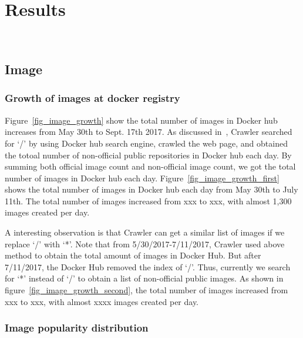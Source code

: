 
\section{Results}

\\

\subsection{Image}

\subsubsection{Growth  of images at docker registry}

Figure~\ref{fig_image_growth} show the total number of images in Docker hub increases from May 30th to Sept. 17th 2017. As discussed in~\cite{XXX}, Crawler searched for `/' by using Docker hub search engine, crawled the web page, and obtained the totoal number of non-official public repositories in Docker hub each day. By summing both official image count and non-official image count, we got the total number of images in Docker hub each day. Figure~\ref{fig_image_growth_first} shows the total number of images in Docker hub each day from May 30th to July 11th. The total number of images increased from xxx to xxx, with almost 1,300 images created per day. 

A interesting observation is that Crawler can get a similar list of images if we replace `/' with `*'. Note that from 5/30/2017-7/11/2017, Crawler used above method to obtain the total amount of images in Docker Hub. But after 7/11/2017, the Docker Hub removed the index of `/'. Thus, currently we search for `*' instead of `/' to obtain a list of non-official public images. As shown in figure~\ref{fig_image_growth_second}, the total number of images increased from xxx to xxx, with almost xxxx images created per day. 

\subsubsection{Image popularity distribution}

